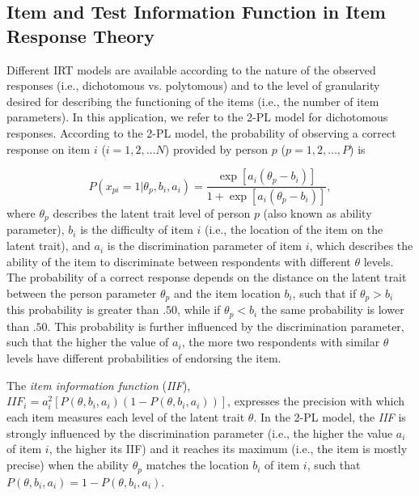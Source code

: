 \documentclass[12pt, a4paper, titilepage]{article}
\begin{document}
\subsection*{Item and Test Information Function in Item Response Theory}

Different IRT models are available according to the nature  of the observed responses (i.e., dichotomous vs. polytomous) and to the level of granularity desired for describing the functioning of the items (i.e., the number of item parameters). In this application, we refer to the 2-PL model \cite{birnbaum1968} for dichotomous responses. According to the 2-PL model, the probability of observing a correct response on item $i$ ($i = {1, 2, \ldots N}$) provided by person $p$ ($p = {1, 2, \ldots, P}$) is 

\begin{equation*}
	P(x_{pi} = 1|\theta_p, b_i, a_i) = \dfrac{\exp[a_i (\theta_p - b_i)]}{1 + \exp[a_i (\theta_p - b_i)]}, 
\end{equation*}
where $\theta_p$ describes the latent trait level of person $p$ (also known as ability parameter), $b_i$ is the difficulty of item $i$ (i.e., the location of the item on the latent trait), and $a_i$ is the discrimination parameter of item $i$, which describes the ability of the item to discriminate between respondents with different $\theta$ levels. 
The probability of a correct response depends on the distance on the latent trait between the person parameter $\theta_p$ and the item location $b_i$, such that if $\theta_p > b_i$ this probability is greater than $.50$, while if $\theta_p < b_i$ the same probability is lower than $.50$. This probability is further influenced by the discrimination parameter, such that the higher the value of $a_i$, the more two respondents with similar $\theta$ levels have different probabilities of endorsing the item. 
 
The \emph{item information function} (\emph{IIF}), $\mathit{IIF}_i= a_i^2[P(\theta, b_i, a_i)(1-P(\theta, b_i, a_i))]$, expresses the precision with which each item measures each level of the latent trait $\theta$.
In the 2-PL model, the \emph{IIF} is strongly influenced by the discrimination parameter (i.e., the higher the value $a_i$ of item $i$, the higher its IIF) and it reaches its maximum (i.e., the item is mostly precise) when the ability $\theta_p$ matches the location $b_i$ of item $i$, such that $ P(\theta, b_i, a_i) = 1-P(\theta, b_i, a_i)$. 
\end{document}
